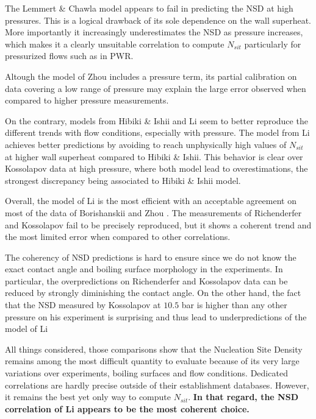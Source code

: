 The Lemmert \& Chawla model appears to fail in predicting the NSD at high pressures. This is a logical drawback of its sole dependence on the wall superheat. More importantly it increasingly underestimates the NSD as pressure increases, which makes it a clearly unsuitable correlation to compute $N_{sit}$ particularly for pressurized flows such as in PWR.

Altough the model of Zhou \etal includes a pressure term, its partial calibration on data covering a low range of pressure may explain the large error observed when compared to higher pressure measurements.

On the contrary, models from Hibiki \& Ishii and Li \etal seem to better reproduce the different trends with flow conditions, especially with pressure. The model from Li \etal achieves better predictions by avoiding to reach unphysically high values of $N_{sit}$ at higher wall superheat compared to Hibiki \& Ishii. This behavior is clear over Kossolapov data at high pressure, where both model lead to overestimations, the strongest discrepancy being associated to Hibiki \& Ishii model.

Overall, the model of Li \etal is the most efficient with an acceptable agreement on most of the data of Borishanskii and Zhou \etal. The measurements of Richenderfer and Kossolapov fail to be precisely reproduced, but it shows a coherent trend and the most limited error when compared to other correlations.

\begin{remark*}{}
The coherency of NSD predictions is hard to ensure since we do not know the exact contact angle and boiling surface morphology in the experiments. In particular, the overpredictions on Richenderfer and Kossolapov data can be reduced by strongly diminishing the contact angle. On the other hand, the fact that the NSD measured by Kossolapov at $10.5$ bar is higher than any other pressure on his experiment is surprising and thus lead to underpredictions of the model of Li \etal
\end{remark*}


All things considered, those comparisons show that the Nucleation Site Density remains among the most difficult quantity to evaluate because of its very large variations over experiments, boiling surfaces and flow conditions. Dedicated correlations are hardly precise outside of their establishment databases. However, it remains the best yet only way to compute $N_{sit}$. \textbf{In that regard, the NSD correlation of Li \etal appears to be the most coherent choice.}



